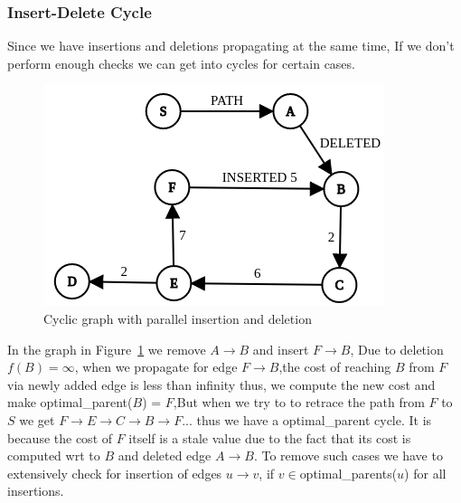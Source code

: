 \documentclass[a4paper]{article}
\begin{document}
\subsubsection{Insert-Delete Cycle}\label{subsec:ins_del_cycle}
Since we have insertions and deletions propagating at the same time, If we don't perform enough checks we can get into cycles for certain cases. 
\begin{figure}[H]
    \centering
    \includegraphics[scale=0.45]{img/ins_del_cycle.png}
    \caption{Cyclic graph with parallel insertion and deletion}
    \label{fig:insert_delete_cycle}
\end{figure}
In the graph in Figure~\ref{fig:insert_delete_cycle} we remove $A \rightarrow B$ and insert $F \rightarrow B$, Due to deletion $f(B) = \infty$, when we propagate for edge $F \rightarrow B$,the cost of reaching $B$ from $F$ via newly added edge is less than infinity thus, we compute the new cost and make optimal\_parent($B$) = $F$,But when we try to to retrace the path from $F$ to $S$ we get $F\rightarrow E\rightarrow C\rightarrow B\rightarrow F...$ thus we have a optimal\_parent cycle. It is because the cost of $F$ itself is a stale value due to the fact that its cost is computed wrt to $B$ and deleted edge $A \rightarrow B$. To remove such cases we have to extensively check for insertion of edges $u \rightarrow v$, if $v \in $optimal\_parents($u$) for all insertions.
\end{document}
